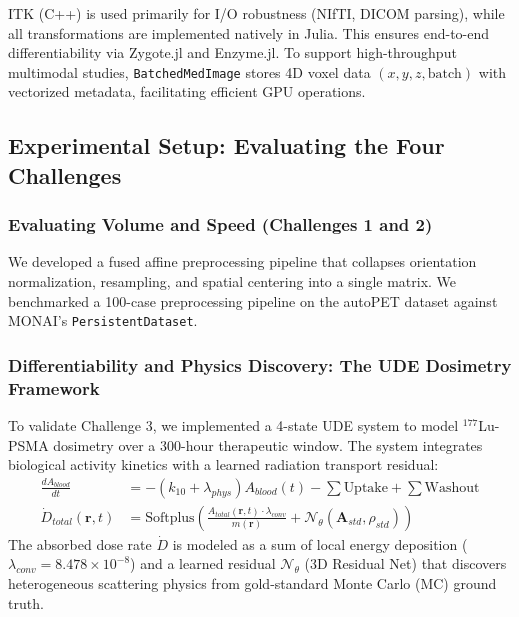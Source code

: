 \documentclass[10pt,letterpaper]{article}
\begin{document}
ITK (C++) is used primarily for I/O robustness (NIfTI, DICOM parsing), while all transformations are implemented natively in Julia. This ensures end-to-end differentiability via Zygote.jl and Enzyme.jl. To support high-throughput multimodal studies, \texttt{BatchedMedImage} stores 4D voxel data $(x, y, z, \text{batch})$ with vectorized metadata, facilitating efficient GPU operations.

\subsection*{Experimental Setup: Evaluating the Four Challenges}

\subsubsection*{Evaluating Volume and Speed (Challenges 1 and 2)}
We developed a fused affine preprocessing pipeline that collapses orientation normalization, resampling, and spatial centering into a single matrix. We benchmarked a 100-case preprocessing pipeline on the autoPET dataset against MONAI's \texttt{PersistentDataset}.

\subsubsection*{Differentiability and Physics Discovery: The UDE Dosimetry Framework}
To validate Challenge 3, we implemented a 4-state UDE system to model $^{177}$Lu-PSMA dosimetry over a 300-hour therapeutic window. The system integrates biological activity kinetics with a learned radiation transport residual:
\begin{align}
    \frac{dA_{blood}}{dt} &= -(k_{10} + \lambda_{phys}) A_{blood}(t) - \sum \text{Uptake} + \sum \text{Washout} \\
    \dot{D}_{total}(\mathbf{r}, t) &= \text{Softplus} \left( \frac{A_{total}(\mathbf{r}, t) \cdot \lambda_{conv}}{m(\mathbf{r})} + \mathcal{N}_\theta(\mathbf{A}_{std}, \rho_{std}) \right)
\end{align}
The absorbed dose rate $\dot{D}$ is modeled as a sum of local energy deposition ($\lambda_{conv} = 8.478 \times 10^{-8}$) and a learned residual $\mathcal{N}_\theta$ (3D Residual Net) that discovers heterogeneous scattering physics from gold-standard Monte Carlo (MC) ground truth.
\end{document}
